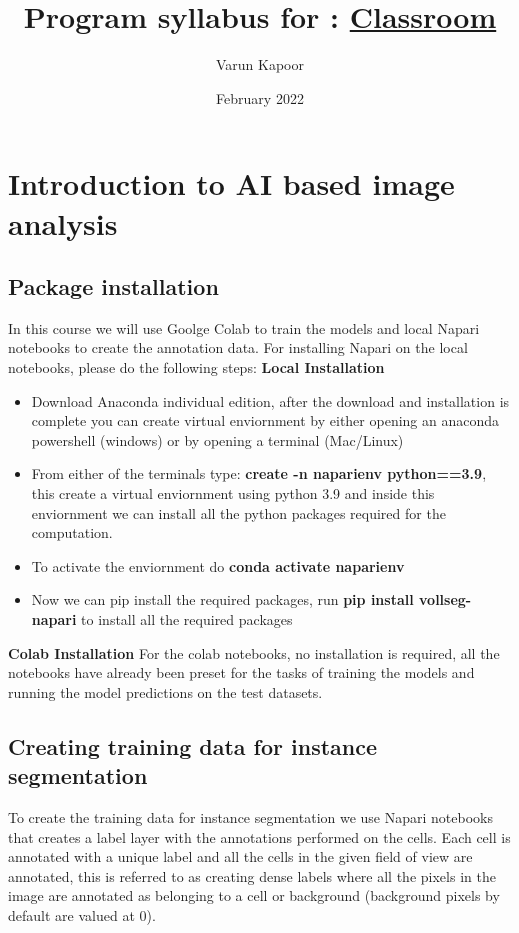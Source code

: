\documentclass[a4paper,10pt]{article}
\title{Program syllabus for : \href{https://kapoorlabs.org/product/introduction-to-python-with-artificial-intelligence/}{Classroom}}
\author[]{Varun Kapoor}
\affil[]{Kapoorlabs, Paris, France}
\date{February 2022}
\begin{document}
\maketitle

\section{Introduction to AI based image analysis}

\subsection{Package installation \label{install}}
In this course we will use Goolge Colab to train the models and local Napari notebooks to create the annotation data. For installing Napari on the local notebooks, please do the following steps:\newline
\textbf{Local Installation}
\begin{itemize}
	\item Download Anaconda individual edition, after the download and installation is complete you can create virtual enviornment by either opening an anaconda powershell (windows) or by opening a terminal (Mac/Linux)
	\item From either of the terminals type: \textbf{create -n naparienv python==3.9}, this create a virtual enviornment using python 3.9 and inside this enviornment we can install all the python packages required for the computation.
	\item To activate the enviornment do \textbf{conda activate naparienv}
	\item Now we can pip install the required packages, run \textbf{pip install vollseg-napari} to install all the required packages    
	
\end{itemize} 
\textbf{Colab Installation}
For the colab notebooks, no installation is required, all the notebooks have already been preset for the tasks of training the models and running the model predictions on the test datasets.

\subsection{Creating training data for instance segmentation \label{td_instance}}
To create the training data for instance segmentation we use Napari notebooks that creates a label layer with the annotations performed on the cells. Each cell is annotated with a unique label and all the cells in the given field of view are annotated, this is referred to as creating dense labels where all the pixels in the image are annotated as belonging to a cell or background (background pixels by default are valued at 0). 
\end{document}

